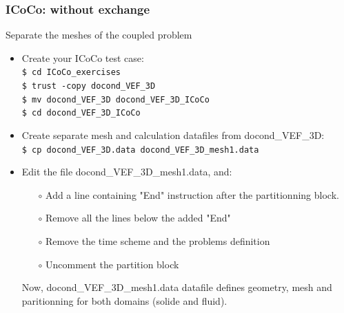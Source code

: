 \documentclass[10pt, hyperref={unicode=true,pdfusetitle, bookmarks=true,bookmarksnumbered=false,bookmarksopen=false, breaklinks=false,pdfborder={0 0 1},backref=true,colorlinks=true,linkcolor=darkblue,pageanchor, urlcolor=darkblue}]{beamer}
\begin{document}
\begin{frame}
\frametitle{ICoCo: without exchange}
\begin{block}{Separate the meshes of the coupled problem}
\begin{itemize}
\item Create your ICoCo test case:\\
\texttt{\$ cd ICoCo\_exercises}\\
\texttt{\$ trust -copy docond\_VEF\_3D}\\
\texttt{\$ mv docond\_VEF\_3D docond\_VEF\_3D\_ICoCo}\\
\texttt{\$ cd docond\_VEF\_3D\_ICoCo}\\
\item Create separate mesh and calculation datafiles from docond\_VEF\_3D:\\
\texttt{\$ cp docond\_VEF\_3D.data docond\_VEF\_3D\_mesh1.data}\\
\item Edit the file docond\_VEF\_3D\_mesh1.data, and:
    \begin{itemize}
    \item [$\circ$] Add a line containing "End" instruction after the partitionning block.
    \item [$\circ$] Remove all the lines below the added "End"
    \item [$\circ$] Remove the time scheme and the problems definition
    \item [$\circ$] Uncomment the partition block
    \end{itemize}
    Now, docond\_VEF\_3D\_mesh1.data datafile defines geometry, mesh and paritionning for both domains (solide and fluid).
\end{itemize}
\end{block}
\end{frame}
\end{document}
